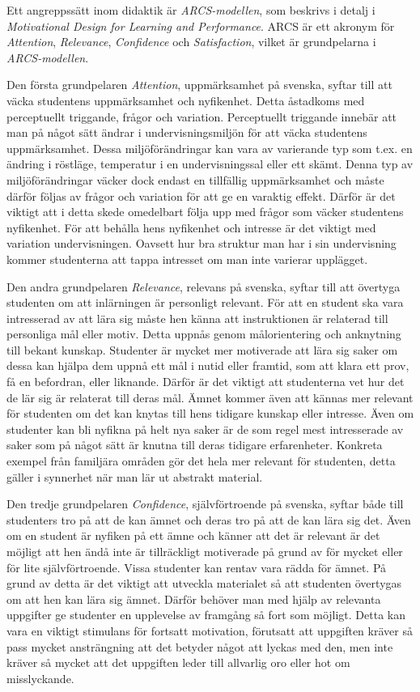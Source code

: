 \documentclass[]{article}
\begin{document}
Ett angreppssätt inom didaktik är \textit{ARCS-modellen},
som beskrivs i detalj i
\textit{Motivational Design for Learning and Performance}.
ARCS är ett akronym för \textit{Attention}, \textit{Relevance},
\textit{Confidence} och \textit{Satisfaction}, vilket är grundpelarna
i \textit{ARCS-modellen}.

Den första grundpelaren \textit{Attention}, uppmärksamhet på svenska,
syftar till att väcka studentens uppmärksamhet och nyfikenhet.
Detta åstadkoms med perceptuellt triggande, frågor och variation.
Perceptuellt triggande innebär att man på något sätt ändrar i
undervisningsmiljön för att väcka studentens uppmärksamhet.
Dessa miljöförändringar kan vara av varierande typ som t.ex. en ändring i
röstläge, temperatur i en undervisningssal eller ett skämt.
Denna typ av miljöförändringar väcker dock endast en tillfällig uppmärksamhet
och måste därför följas av frågor och variation för att ge en varaktig effekt.
Därför är det viktigt att i detta skede omedelbart följa upp med frågor som väcker
studentens nyfikenhet. För att behålla hens nyfikenhet och
intresse är det viktigt med variation undervisningen.
Oavsett hur bra struktur man har i sin undervisning kommer studenterna att tappa
intresset om man inte varierar upplägget.

Den andra grundpelaren \textit{Relevance}, relevans på svenska,
syftar till att övertyga studenten om att inlärningen är personligt relevant.
För att en student ska vara intresserad av att lära sig måste hen känna
att instruktionen är relaterad till personliga mål eller motiv.
Detta uppnås genom målorientering och anknytning till bekant kunskap.
Studenter är mycket mer motiverade att lära sig saker om dessa kan hjälpa dem
uppnå ett mål i nutid eller framtid, som att klara ett prov, få en befordran,
eller liknande. Därför är det viktigt att studenterna vet hur det de lär sig är
relaterat till deras mål. Ämnet kommer även att kännas mer relevant för studenten
om det kan knytas till hens tidigare kunskap eller intresse. Även om studenter kan
bli nyfikna på helt nya saker är de som regel mest intresserade av saker som på
något sätt är knutna till deras tidigare erfarenheter.
Konkreta exempel från familjära områden gör det hela mer relevant för studenten,
detta gäller i synnerhet när man lär ut abstrakt material.

Den tredje grundpelaren \textit{Confidence}, självförtroende på svenska,
syftar både till studenters tro på att de kan ämnet och deras tro på att
de kan lära sig det. Även om en student är nyfiken på ett ämne och känner
att det är relevant är det möjligt att hen ändå inte är tillräckligt
motiverade på grund av för mycket eller för lite självförtroende.
Vissa studenter kan rentav vara rädda för ämnet. På grund av detta är det
viktigt att utveckla materialet så att studenten övertygas om att hen kan
lära sig ämnet. Därför behöver man med hjälp av relevanta uppgifter ge studenter
en upplevelse av framgång så fort som möjligt. Detta kan vara en viktigt
stimulans för fortsatt motivation, förutsatt att uppgiften kräver så pass
mycket ansträngning att det betyder något att lyckas med den, men inte kräver
så mycket att det uppgiften leder till allvarlig oro eller hot om misslyckande.
\end{document}
